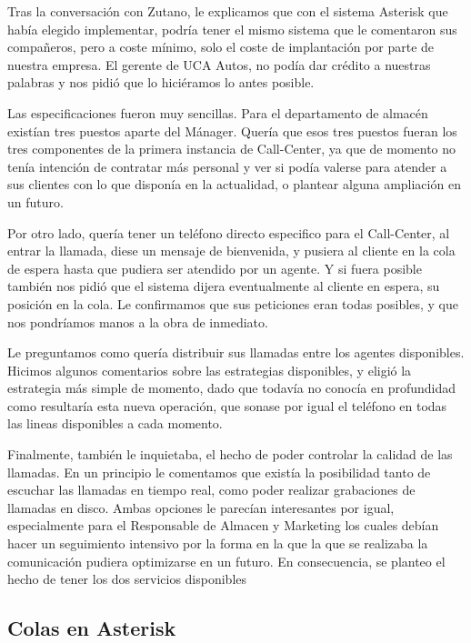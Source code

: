 Tras la conversación con Zutano, le explicamos que con el sistema Asterisk que había elegido implementar, podría tener el mismo sistema que le comentaron sus compañeros, pero a coste mínimo, solo el coste de implantación por parte de nuestra empresa. El gerente de UCA Autos, no podía dar crédito a nuestras palabras y nos pidió que lo hiciéramos lo antes posible.

Las especificaciones fueron muy sencillas. Para el departamento de almacén existían tres puestos aparte del Mánager. Quería que esos tres puestos fueran los tres componentes de la primera instancia de Call-Center, ya que de momento no tenía intención de contratar más personal y ver si podía valerse para atender a sus clientes con lo que disponía en la actualidad, o plantear alguna ampliación en un futuro. 

Por otro lado, quería tener un teléfono directo especifico para el Call-Center, al entrar la llamada, diese un mensaje de bienvenida, y pusiera al cliente en la cola de espera hasta que pudiera ser atendido por un agente. Y si fuera posible también nos pidió que el sistema dijera eventualmente al cliente en espera, su posición en la cola. Le confirmamos que sus peticiones eran todas posibles, y que nos pondríamos manos a la obra de inmediato.

Le preguntamos como quería distribuir sus llamadas entre los agentes disponibles. Hicimos algunos comentarios sobre las estrategias disponibles, y eligió la estrategia más simple de momento, dado que todavía no conocía en profundidad como resultaría esta nueva operación, que sonase por igual el teléfono en todas las lineas disponibles a cada momento.

Finalmente, también le inquietaba, el hecho de poder controlar la calidad de las llamadas. En un principio le comentamos que existía la posibilidad tanto de escuchar las llamadas en tiempo real, como poder realizar grabaciones de llamadas en disco. Ambas opciones le parecían interesantes por igual, especialmente para el Responsable de Almacen y Marketing los cuales debían hacer un seguimiento intensivo por la forma en la que la que se realizaba la comunicación pudiera optimizarse en un futuro. En consecuencia, se planteo el hecho de tener los dos servicios disponibles

\newpage

\color[rgb]{0,0,0}

\subsection{Colas en Asterisk}

